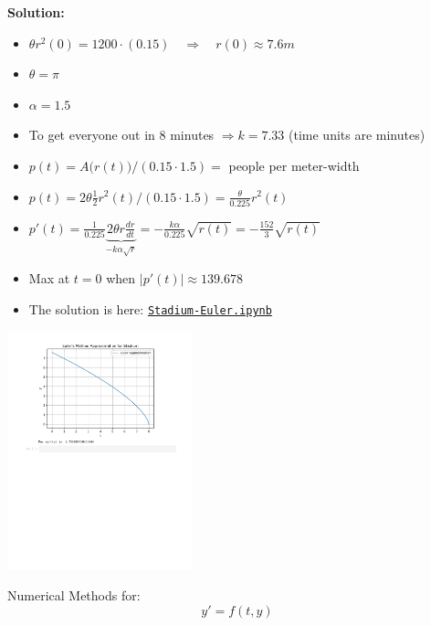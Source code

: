 \documentclass{workbook}
\begin{document}
\begin{solution}
\begin{slide}

\textbf{Solution:}

\begin{itemize}
\item $\theta r^2(0) = 1200 \cdot (0.15) \quad \Rightarrow \quad r(0) \approx 7.6m$
\item $\theta = \pi$
\item $\alpha = 1.5$
\item To get everyone out in 8 minutes $\Rightarrow k = 7.33$ (time units are minutes)
\item $p(t) = A\big(r(t)\big)/(0.15\cdot 1.5) = $ people per meter-width
\item $p(t) = 2\theta \frac12 r^2(t)/(0.15\cdot 1.5) = \frac{\theta}{0.225} r^2(t)$
\item $\displaystyle p'(t) = \frac{1}{0.225} \underbrace{2 \theta r\frac{dr}{dt}}_{- k \alpha \sqrt{r}} = -\frac{k \alpha}{0.225} \sqrt{r(t)} = - \frac{152}{3} \sqrt{r(t)}$ 
\item Max at $t=0$ when $|p'(t)| \approx 139.678$
\item The solution is here: \href{https://utoronto.syzygy.ca/jupyter/user-redirect/git-pull?repo=https://github.com/bigfatbernie/IBLMathModeling&subPath=python/Stadium-Euler.ipynb}{\tt Stadium-Euler.ipynb}
\end{itemize}

\includegraphics[width=0.4\textwidth]{python/Stadium-Euler-ipynb.pdf}


\end{slide}	
\end{solution}





\begin{slide}

\question

Numerical Methods for:
\[ y' = f(t,y) \]



\end{slide}
\end{document}
